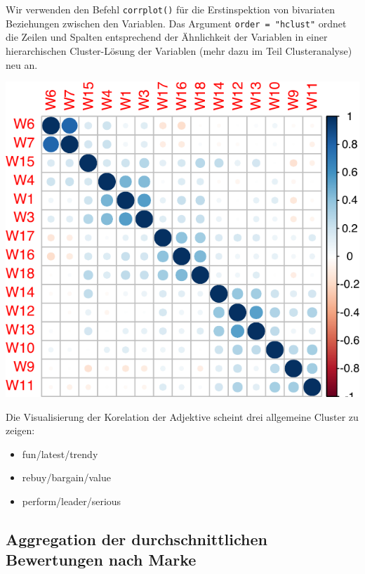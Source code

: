 \documentclass[12pt,]{book}
\newenvironment{Shaded}{\begin{snugshade}}{\end{snugshade}}
\newcommand{\KeywordTok}[1]{\textcolor[rgb]{0.13,0.29,0.53}{\textbf{{#1}}}}
\newcommand{\StringTok}[1]{\textcolor[rgb]{0.31,0.60,0.02}{{#1}}}
\newcommand{\NormalTok}[1]{{#1}}
\providecommand{\tightlist}{%
  \setlength{\itemsep}{0pt}\setlength{\parskip}{0pt}}
\begin{document}
Wir verwenden den Befehl \texttt{corrplot()} für die Erstinspektion von
bivariaten Beziehungen zwischen den Variablen. Das Argument
\texttt{order\ =\ "hclust"} ordnet die Zeilen und Spalten entsprechend
der Ähnlichkeit der Variablen in einer hierarchischen Cluster-Lösung der
Variablen (mehr dazu im Teil Clusteranalyse) neu an.

\begin{Shaded}
\end{Shaded}

\begin{center}\includegraphics[width=0.7\linewidth]{083_Dimensionsreduktion_files/figure-latex/unnamed-chunk-7-1} \end{center}

Die Visualisierung der Korelation der Adjektive scheint drei allgemeine
Cluster zu zeigen:

\begin{itemize}
\tightlist
\item
  fun/latest/trendy
\item
  rebuy/bargain/value
\item
  perform/leader/serious
\end{itemize}

\subsection{Aggregation der durchschnittlichen Bewertungen nach
Marke}\label{aggregation-der-durchschnittlichen-bewertungen-nach-marke}
\end{document}
